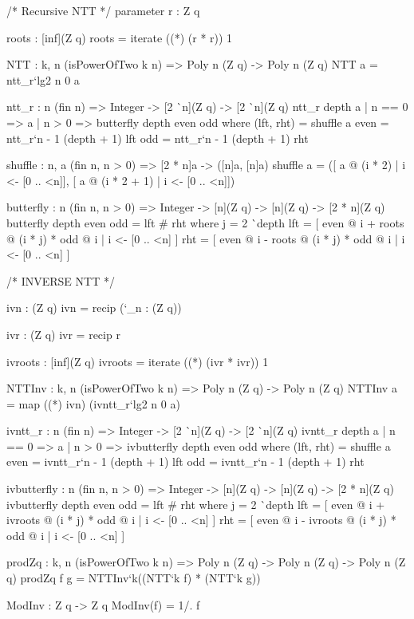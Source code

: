 \begin{code}
  /* Recursive NTT */
  parameter
    r : Z q

  roots : [inf](Z q)
  roots = iterate ((*) (r * r)) 1

  NTT : {k, n} (isPowerOfTwo k n) => Poly n (Z q) -> Poly n (Z q)
  NTT a = ntt_r`{lg2 n} 0 a

  ntt_r : {n} (fin n) =>
    Integer -> [2 ^^ n](Z q) -> [2 ^^ n](Z q)
  ntt_r depth a
    | n == 0 => a
    | n > 0 => butterfly depth even odd
      where
        (lft, rht) = shuffle a
        even = ntt_r`{n - 1} (depth + 1) lft
        odd = ntt_r`{n - 1} (depth + 1) rht

  shuffle : {n, a} (fin n, n > 0) => [2 * n]a -> ([n]a, [n]a)
  shuffle a =
    ([ a @ (i * 2) | i <- [0 .. <n]], [ a @ (i * 2 + 1) | i <- [0 .. <n]])

  butterfly : {n} (fin n, n > 0) =>
    Integer -> [n](Z q) -> [n](Z q) -> [2 * n](Z q)
  butterfly depth even odd =
    lft # rht
    where
      j = 2 ^^ depth
      lft = [ even @ i + roots @ (i * j) * odd @ i | i <- [0 .. <n] ]
      rht = [ even @ i - roots @ (i * j) * odd @ i | i <- [0 .. <n] ]
\end{code}

\begin{code}
  /* INVERSE NTT */

  ivn : (Z q)
  ivn = recip (`_n : (Z q))

  ivr : (Z q)
  ivr = recip r

  ivroots : [inf](Z q)
  ivroots = iterate ((*) (ivr * ivr)) 1

  NTTInv : {k, n} (isPowerOfTwo k n) => Poly n (Z q) -> Poly n (Z q)
  NTTInv a =
    map ((*) ivn) (ivntt_r`{lg2 n} 0 a)

  ivntt_r : {n} (fin n) => Integer -> [2 ^^ n](Z q) -> [2 ^^ n](Z q)
  ivntt_r depth a
    | n == 0 => a
    | n > 0 => ivbutterfly depth even odd
      where
        (lft, rht) = shuffle a
        even = ivntt_r`{n - 1} (depth + 1) lft
        odd = ivntt_r`{n - 1} (depth + 1) rht

  ivbutterfly : {n} (fin n, n > 0) =>
    Integer -> [n](Z q) -> [n](Z q) -> [2 * n](Z q)
  ivbutterfly depth even odd =
    lft # rht
    where
      j = 2 ^^ depth
      lft = [ even @ i + ivroots @ (i * j) * odd @ i | i <- [0 .. <n] ]
      rht = [ even @ i - ivroots @ (i * j) * odd @ i | i <- [0 .. <n] ]
\end{code}

\begin{code}
  prodZq : {k, n} (isPowerOfTwo k n) =>
    Poly n (Z q) -> Poly n (Z q) -> Poly n (Z q)
  prodZq f g = NTTInv`{k}((NTT`{k} f) * (NTT`{k} g))

  ModInv : Z q -> Z q
  ModInv(f) =  1/. f
\end{code}

